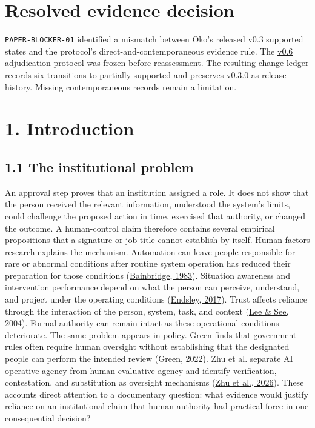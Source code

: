 \documentclass[11pt]{article}
\begin{document}
\section*{Resolved evidence decision}
\texttt{PAPER-BLOCKER-01} identified a mismatch between Oko's released v0.3 supported states and the protocol's direct-and-contemporaneous evidence rule. The \href{../protocols/oko-evidence-adjudication-v0.6.0.md}{v0.6 adjudication protocol} was frozen before reassessment. The resulting \href{../assessments/v0.6.0/oko-change-ledger.json}{change ledger} records six transitions to partially supported and preserves v0.3.0 as release history. Missing contemporaneous records remain a limitation.
\FloatBarrier
\section*{1. Introduction}
\subsection*{1.1 The institutional problem}
An approval step proves that an institution assigned a role. It does not show that the person received the relevant information, understood the system's limits, could challenge the proposed action in time, exercised that authority, or changed the outcome. A human-control claim therefore contains several empirical propositions that a signature or job title cannot establish by itself.
Human-factors research explains the mechanism. Automation can leave people responsible for rare or abnormal conditions after routine system operation has reduced their preparation for those conditions (\href{https://doi.org/10.1016/0005-1098(83)90046-8}{Bainbridge, 1983}). Situation awareness and intervention performance depend on what the person can perceive, understand, and project under the operating conditions (\href{https://doi.org/10.1177/0018720816681350}{Endsley, 2017}). Trust affects reliance through the interaction of the person, system, task, and context (\href{https://doi.org/10.1518/hfes.46.1.50_30392}{Lee \& See, 2004}). Formal authority can remain intact as these operational conditions deteriorate.
The same problem appears in policy. Green finds that government rules often require human oversight without establishing that the designated people can perform the intended review (\href{https://doi.org/10.1016/j.clsr.2022.105681}{Green, 2022}). Zhu et al. separate AI operative agency from human evaluative agency and identify verification, contestation, and substitution as oversight mechanisms (\href{https://doi.org/10.1007/s43681-026-01147-7}{Zhu et al., 2026}). These accounts direct attention to a documentary question: what evidence would justify reliance on an institutional claim that human authority had practical force in one consequential decision?
\end{document}
